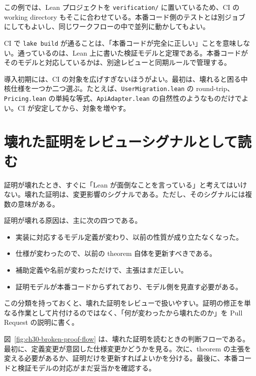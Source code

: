 この例では、Lean プロジェクトを \texttt{verification/} に置いているため、CI の working directory もそこに合わせている。本番コード側のテストとは別ジョブにしてもよいし、同じワークフローの中で並列に動かしてもよい。

\begin{warningbox}
CI で \texttt{lake build} が通ることは、「本番コードが完全に正しい」ことを意味しない。通っているのは、Lean 上に書いた検証モデルと定理である。本番コードがそのモデルと対応しているかは、別途レビューと同期ルールで管理する。
\end{warningbox}

導入初期には、CI の対象を広げすぎないほうがよい。最初は、壊れると困る中核仕様を一つか二つ選ぶ。たとえば、\texttt{UserMigration.lean} の round-trip、\texttt{Pricing.lean} の単純な等式、\texttt{ApiAdapter.lean} の自然性のようなものだけでよい。CI が安定してから、対象を増やす。

\section{壊れた証明をレビューシグナルとして読む}

証明が壊れたとき、すぐに「Lean が面倒なことを言っている」と考えてはいけない。壊れた証明は、変更影響のシグナルである。ただし、そのシグナルには複数の意味がある。

証明が壊れる原因は、主に次の四つである。

\begin{itemize}
\item 実装に対応するモデル定義が変わり、以前の性質が成り立たなくなった。
\item 仕様が変わったので、以前の theorem 自体を更新すべきである。
\item 補助定義や名前が変わっただけで、主張はまだ正しい。
\item 証明モデルが本番コードからずれており、モデル側を見直す必要がある。
\end{itemize}

この分類を持っておくと、壊れた証明をレビューで扱いやすい。証明の修正を単なる作業として片付けるのではなく、「何が変わったから壊れたのか」を Pull Request の説明に書く。


図~\ref{fig:ch30-broken-proof-flow} は、壊れた証明を読むときの判断フローである。最初に、定義変更が意図した仕様変更かどうかを見る。次に、theorem の主張を変える必要があるか、証明だけを更新すればよいかを分ける。最後に、本番コードと検証モデルの対応がまだ妥当かを確認する。

